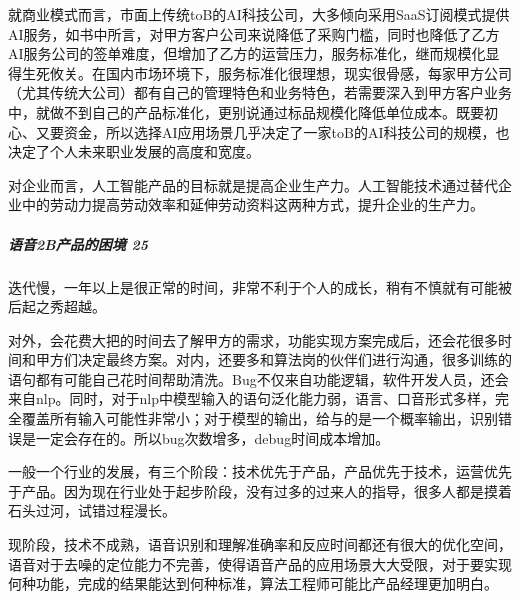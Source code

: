 \documentclass[letterpaper,11pt,english]{sphinxmanual}
\begin{document}
就商业模式而言，市面上传统toB的AI科技公司，大多倾向采用SaaS订阅模式提供AI服务，如书中所言，对甲方客户公司来说降低了采购门槛，同时也降低了乙方AI服务公司的签单难度，但增加了乙方的运营压力，服务标准化，继而规模化显得生死攸关。在国内市场环境下，服务标准化很理想，现实很骨感，每家甲方公司（尤其传统大公司）都有自己的管理特色和业务特色，若需要深入到甲方客户业务中，就做不到自己的产品标准化，更别说通过标品规模化降低单位成本。既要初心、又要资金，所以选择AI应用场景几乎决定了一家toB的AI科技公司的规模，也决定了个人未来职业发展的高度和宽度。

对企业而言，人工智能产品的目标就是提高企业生产力。人工智能技术通过替代企业中的劳动力提高劳动效率和延伸劳动资料这两种方式，提升企业的生产力。%
\begin{footnote}[65]\sphinxAtStartFootnote
{}
%
\end{footnote}


\subparagraph{语音2B产品的困境 25\sphinxfootnotemark[66]}
\label{\detokenize{chapter_introduction/2B:b-25}}%
\begin{footnotetext}[66]\sphinxAtStartFootnote
{}
%
\end{footnotetext}\ignorespaces 
{}
迭代慢，一年以上是很正常的时间，非常不利于个人的成长，稍有不慎就有可能被后起之秀超越。

对外，会花费大把的时间去了解甲方的需求，功能实现方案完成后，还会花很多时间和甲方们决定最终方案。对内，还要多和算法岗的伙伴们进行沟通，很多训练的语句都有可能自己花时间帮助清洗。Bug不仅来自功能逻辑，软件开发人员，还会来自nlp。同时，对于nlp中模型输入的语句泛化能力弱，语言、口音形式多样，完全覆盖所有输入可能性非常小；对于模型的输出，给与的是一个概率输出，识别错误是一定会存在的。所以bug次数增多，debug时间成本增加。

一般一个行业的发展，有三个阶段：技术优先于产品，产品优先于技术，运营优先于产品。因为现在行业处于起步阶段，没有过多的过来人的指导，很多人都是摸着石头过河，试错过程漫长。

现阶段，技术不成熟，语音识别和理解准确率和反应时间都还有很大的优化空间，语音对于去噪的定位能力不完善，使得语音产品的应用场景大大受限，对于要实现何种功能，完成的结果能达到何种标准，算法工程师可能比产品经理更加明白。
\end{document}

